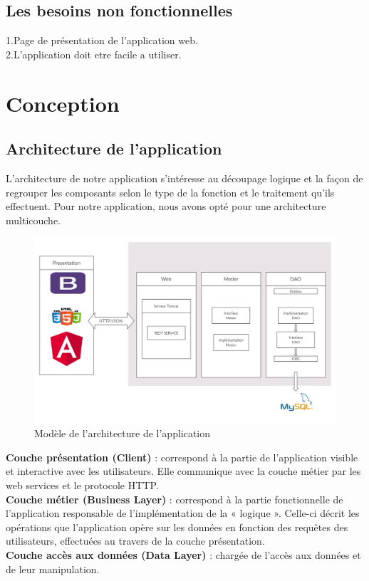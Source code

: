 \subsection{Les besoins non fonctionnelles}

1.Page de présentation de l'application web.\\
2.L'application doit etre facile a utiliser.\\
\section{Conception}
\subsection{Architecture de l’application}
L’architecture de notre application s’intéresse au découpage logique et la façon de regrouper les composants selon le type de la fonction et le traitement qu’ils effectuent. Pour notre application, nous avons opté pour une architecture multicouche.

\begin{figure}[!h]
\begin{center}
\includegraphics[width=17cm]{archit.png}
\caption{Modèle de l’architecture de l’application}
\end{center}
\end{figure}
\noindent\textbf{Couche présentation (Client)} : correspond à la partie de l’application visible et
interactive avec les utilisateurs. Elle communique avec la couche métier par les web services
et le protocole HTTP.\\
\textbf{Couche métier (Business Layer)} : correspond à la partie fonctionnelle de l’application responsable de l’implémentation de la « logique ». Celle-ci décrit les opérations que
l’application opère sur les données en fonction des requêtes des utilisateurs, effectuées au
travers de la couche présentation.\\
\textbf{Couche accès aux données (Data Layer)} : chargée de l’accès aux données et de
leur manipulation.\\

